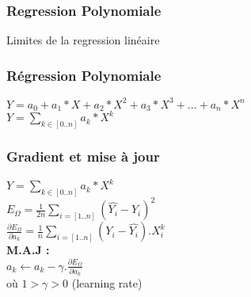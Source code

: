 
\begin{frame}
  \frametitle{Regression Polynomiale}
  Limites de la regression linéaire
\end{frame}

\begin{frame}
  \frametitle{Régression Polynomiale}
  $Y=a_0+a_1*X+a_2*X^2+a_3*X^3+...+a_n*X^n$ \\
  \newline
  $Y=\underset{k \in [0..n]}{\sum}{a_k*X^k}$
\end{frame}

\begin{frame}
  \frametitle{Gradient et mise à jour}
  $Y=\underset{k \in [0..n]}{\sum}{a_k*X^k}$ \\
  $\;$ \\
  $E_{\Omega} = \frac{1}{2n}\underset{i=[1..n]}{\sum}( \hat{Y_i} - Y_i )^2$ \\
  $\;$ \\
  $\frac{\partial{E_{\Omega}}}{\partial{a_k}} = \frac{1}{n}\underset{i=[1..n]}{\sum}(Y_i - \hat{Y_i}).X_i^k$ \\
  $\;$ \\
  $\;$ \\
  \textbf{M.A.J :} \\
  $\;$ \\
  $a_k \leftarrow a_k - \gamma.\frac{\partial{E_{\Omega}}}{\partial{a_k}}$ \\
  $\;$ \\
  où $1 > \gamma > 0$ (learning rate)
\end{frame}
